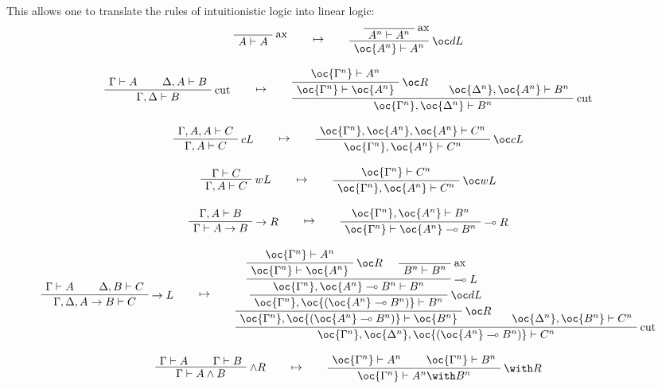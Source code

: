 This allows one to translate the rules of intuitionistic logic into linear logic:
\begin{gather*}
\LabelRule{\rulename{ax}}
\NulRule{A\vdash A}
\DisplayProof
\qquad\mapsto\qquad
\LabelRule{\rulename{ax}}
\NulRule{A^n\vdash A^n}
\LabelRule{\oc d L}
\UnaRule{\oc{A^n}\vdash A^n}
\DisplayProof
\\[2ex]
\AxRule{\Gamma\vdash A}
\AxRule{\Delta,A\vdash B}
\LabelRule{\rulename{cut}}
\BinRule{\Gamma,\Delta\vdash B}
\DisplayProof
\qquad\mapsto\qquad
\AxRule{\oc{\Gamma^n}\vdash A^n}
\LabelRule{\oc R}
\UnaRule{\oc{\Gamma^n}\vdash \oc{A^n}}
\AxRule{\oc{\Delta^n},\oc{A^n}\vdash B^n}
\LabelRule{\rulename{cut}}
\BinRule{\oc{\Gamma^n},\oc{\Delta^n}\vdash B^n}
\DisplayProof
\\[2ex]
\AxRule{\Gamma,A,A\vdash C}
\LabelRule{c L}
\UnaRule{\Gamma,A\vdash C}
\DisplayProof
\qquad\mapsto\qquad
\AxRule{\oc{\Gamma^n},\oc{A^n},\oc{A^n}\vdash C^n}
\LabelRule{\oc c L}
\UnaRule{\oc{\Gamma^n},\oc{A^n}\vdash C^n}
\DisplayProof
\\[2ex]
\AxRule{\Gamma\vdash C}
\LabelRule{w L}
\UnaRule{\Gamma,A\vdash C}
\DisplayProof
\qquad\mapsto\qquad
\AxRule{\oc{\Gamma^n}\vdash C^n}
\LabelRule{\oc w L}
\UnaRule{\oc{\Gamma^n},\oc{A^n}\vdash C^n}
\DisplayProof
\\[2ex]
\AxRule{\Gamma,A\vdash B}
\LabelRule{\imp R}
\UnaRule{\Gamma\vdash A\imp B}
\DisplayProof
\qquad\mapsto\qquad
\AxRule{\oc{\Gamma^n},\oc{A^n}\vdash B^n}
\LabelRule{\limp R}
\UnaRule{\oc{\Gamma^n}\vdash \oc{A^n}\limp B^n}
\DisplayProof
\\[2ex]
\AxRule{\Gamma\vdash A}
\AxRule{\Delta,B\vdash C}
\LabelRule{\imp L}
\BinRule{\Gamma,\Delta,A\imp B\vdash C}
\DisplayProof
\qquad\mapsto\qquad
\AxRule{\oc{\Gamma^n}\vdash A^n}
\LabelRule{\oc R}
\UnaRule{\oc{\Gamma^n}\vdash \oc{A^n}}
\LabelRule{\rulename{ax}}
\NulRule{B^n\vdash B^n}
\LabelRule{\limp L}
\BinRule{\oc{\Gamma^n},\oc{A^n}\limp B^n\vdash B^n}
\LabelRule{\oc d L}
\UnaRule{\oc{\Gamma^n},\oc{(\oc{A^n}\limp B^n)}\vdash B^n}
\LabelRule{\oc R}
\UnaRule{\oc{\Gamma^n},\oc{(\oc{A^n}\limp B^n)}\vdash \oc{B^n}}
\AxRule{\oc{\Delta^n},\oc{B^n}\vdash C^n}
\LabelRule{\rulename{cut}}
\BinRule{\oc{\Gamma^n},\oc{\Delta^n},\oc{(\oc{A^n}\limp B^n)}\vdash C^n}
\DisplayProof
\\[2ex]
\AxRule{\Gamma\vdash A}
\AxRule{\Gamma\vdash B}
\LabelRule{\wedge R}
\BinRule{\Gamma\vdash A\wedge B}
\DisplayProof
\qquad\mapsto\qquad
\AxRule{\oc{\Gamma^n}\vdash A^n}
\AxRule{\oc{\Gamma^n}\vdash B^n}
\LabelRule{\with R}
\BinRule{\oc{\Gamma^n}\vdash A^n\with B^n}
\DisplayProof

\end{gather*}
